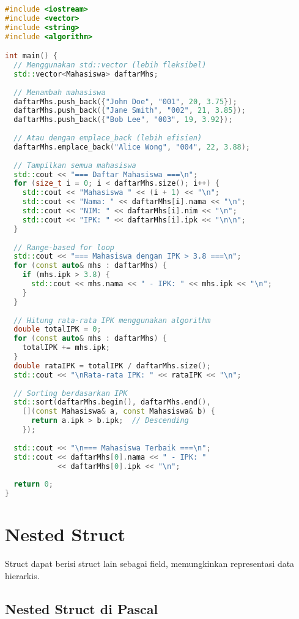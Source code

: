 \documentclass[../main.tex]{subfiles}
\begin{document}
\begin{lstlisting}[language=C++, caption={Array of struct dengan vector di C++}]
#include <iostream>
#include <vector>
#include <string>
#include <algorithm>

int main() {
  // Menggunakan std::vector (lebih fleksibel)
  std::vector<Mahasiswa> daftarMhs;
  
  // Menambah mahasiswa
  daftarMhs.push_back({"John Doe", "001", 20, 3.75});
  daftarMhs.push_back({"Jane Smith", "002", 21, 3.85});
  daftarMhs.push_back({"Bob Lee", "003", 19, 3.92});
  
  // Atau dengan emplace_back (lebih efisien)
  daftarMhs.emplace_back("Alice Wong", "004", 22, 3.88);
  
  // Tampilkan semua mahasiswa
  std::cout << "=== Daftar Mahasiswa ===\n";
  for (size_t i = 0; i < daftarMhs.size(); i++) {
    std::cout << "Mahasiswa " << (i + 1) << "\n";
    std::cout << "Nama: " << daftarMhs[i].nama << "\n";
    std::cout << "NIM: " << daftarMhs[i].nim << "\n";
    std::cout << "IPK: " << daftarMhs[i].ipk << "\n\n";
  }
  
  // Range-based for loop
  std::cout << "=== Mahasiswa dengan IPK > 3.8 ===\n";
  for (const auto& mhs : daftarMhs) {
    if (mhs.ipk > 3.8) {
      std::cout << mhs.nama << " - IPK: " << mhs.ipk << "\n";
    }
  }
  
  // Hitung rata-rata IPK menggunakan algorithm
  double totalIPK = 0;
  for (const auto& mhs : daftarMhs) {
    totalIPK += mhs.ipk;
  }
  double rataIPK = totalIPK / daftarMhs.size();
  std::cout << "\nRata-rata IPK: " << rataIPK << "\n";
  
  // Sorting berdasarkan IPK
  std::sort(daftarMhs.begin(), daftarMhs.end(),
    [](const Mahasiswa& a, const Mahasiswa& b) {
      return a.ipk > b.ipk;  // Descending
    });
  
  std::cout << "\n=== Mahasiswa Terbaik ===\n";
  std::cout << daftarMhs[0].nama << " - IPK: " 
            << daftarMhs[0].ipk << "\n";
  
  return 0;
}
\end{lstlisting}

\section{Nested Struct}

Struct dapat berisi struct lain sebagai field, memungkinkan representasi data hierarkis.

\subsection{Nested Struct di Pascal}
\end{document}
